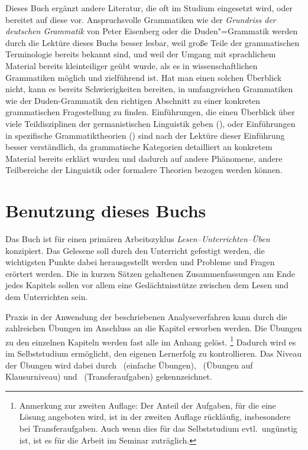 Dieses Buch ergänzt andere Literatur, die oft im Studium eingesetzt wird, oder bereitet auf diese vor.
Anspruchsvolle Grammatiken wie der \textit{Grundriss der deutschen Grammatik} von Peter Eisenberg \citep{Eisenberg1,Eisenberg2} oder die Duden"=Grammatik \citep{Duden8} werden durch die Lektüre dieses Buchs besser lesbar, weil große Teile der grammatischen Terminologie bereits bekannt sind, und weil der Umgang mit sprachlichem Material bereits kleinteiliger geübt wurde, als es in wissenschaftlichen Grammatiken möglich und zielführend ist.
Hat man einen solchen Überblick nicht, kann es bereits Schwierigkeiten bereiten, in umfangreichen Grammatiken wie der Duden-Grammatik den richtigen Abschnitt zu einer konkreten grammatischen Fragestellung zu finden.
Einführungen, die einen Überblick über viele Teildisziplinen der germanistischen Linguistik geben (\zB \citealp{EgL07,SgL07}), oder Einführungen in spezifische Grammatiktheorien (\zB \citealp{Grewendorf02, Mueller08}) sind nach der Lektüre dieser Einführung besser verständlich, da grammatische Kategorien detailliert an konkretem Material bereits erklärt wurden und dadurch auf andere Phänomene, andere Teilbereiche der Linguistik oder formalere Theorien bezogen werden können.

\section*{Benutzung dieses Buchs}

Das Buch ist für einen primären Arbeitszyklus \textit{Lesen--Unterrichten--Üben} konzipiert.
Das Gelesene soll durch den Unterricht gefestigt werden, die wichtigsten Punkte dabei herausgestellt werden und Probleme und Fragen erörtert werden.
Die in kurzen Sätzen gehaltenen Zusammenfassungen am Ende jedes Kapitels sollen vor allem eine Gedächtnisstütze zwischen dem Lesen und dem Unterrichten sein.

Praxis in der Anwendung der beschriebenen Analyseverfahren kann durch die zahlreichen Übungen im Anschluss an die Kapitel erworben werden.
Die Übungen zu den einzelnen Kapiteln werden fast alle im Anhang gelöst.%
\footnote{Anmerkung zur zweiten Auflage:
Der Anteil der Aufgaben, für die eine Lösung angeboten wird, ist in der zweiten Auflage rückläufig, insbesondere bei Transferaufgaben.
Auch wenn dies für das Selbststudium evtl.\ ungünstig ist, ist es für die Arbeit im Seminar zuträglich.}
Dadurch wird es im Selbststudium ermöglicht, den eigenen Lernerfolg zu kontrollieren.
Das Niveau der Übungen wird dabei durch \onestar\ (einfache Übungen), \twostar\ (Übungen auf Klausurniveau) und \tristar\ (Transferaufgaben) gekennzeichnet.

